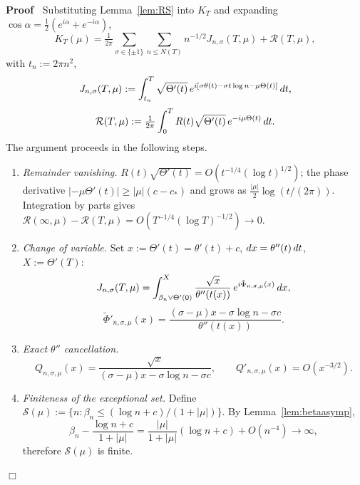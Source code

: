 \documentclass{article}
\newcommand{\assign}{:=}
\newcommand{\tmem}[1]{{\em #1\/}}
\newenvironment{proof}{\noindent\textbf{Proof\ }}{\hspace*{\fill}$\Box$\medskip}
\begin{document}
\begin{proof}
  Substituting Lemma~\ref{lem:RS} into $K_T$ and expanding $\cos \alpha =
  \tfrac{1}{2} (e^{i \alpha} + e^{- i \alpha})$,
  \[ K_T (\mu) = \tfrac{1}{2 \pi} \sum_{\sigma \in \{\pm 1\}} \sum_{n \le N
     (T)} n^{- 1 / 2} J_{n, \sigma} (T, \mu) +\mathcal{R} (T, \mu), \]
  with $t_n \assign 2 \pi n^2$,
  \[ J_{n, \sigma} (T, \mu) \assign \int_{t_n}^T \sqrt{\Theta' (t)} 
     \hspace{0.17em} e^{i [\sigma \theta (t) - \sigma t \log n - \mu \Theta
     (t)]}  \hspace{0.17em} dt, \]
  \[ \mathcal{R} (T, \mu) \assign \tfrac{1}{2 \pi} \int_0^T R (t)
     \sqrt{\Theta' (t)}  \hspace{0.17em} e^{- i \mu \Theta (t)} 
     \hspace{0.17em} dt. \]
  The argument proceeds in the following steps.
  \begin{enumerate}
    \item {\tmem{Remainder vanishing.}} $R (t) \sqrt{\Theta' (t)} = O (t^{- 1
    / 4} (\log t)^{1 / 2})$; the phase derivative $| - \mu \Theta' (t) | \ge |
    \mu |  (c - c_{\ast})$ and grows as $\tfrac{| \mu |}{2} \log (t / (2
    \pi))$. Integration by parts gives $\mathcal{R} (\infty, \mu) -\mathcal{R}
    (T, \mu) = O (T^{- 1 / 4} (\log T)^{- 1 / 2}) \to 0$.
    
    \item {\tmem{Change of variable.}} Set $x \assign \Theta' (t) = \theta'
    (t) + c$, $dx = \theta'' (t)  \hspace{0.17em} dt$, $X \assign \Theta'
    (T)$:
    \[ J_{n, \sigma} (T, \mu) = \int_{\beta_n \vee \Theta' (0)}^X
       \frac{\sqrt{x}}{\theta'' (t (x))}  \hspace{0.17em} e^{i
       \tilde{\Phi}_{n, \sigma, \mu} (x)}  \hspace{0.17em} dx, \]
    \[ \tilde{\Phi}'_{n, \sigma, \mu} (x) = \frac{(\sigma - \mu) x - \sigma
       \log n - \sigma c}{\theta'' (t (x))} . \]
    \item {\tmem{Exact $\theta''$ cancellation.}}
    \[ Q_{n, \sigma, \mu} (x) = \frac{\sqrt{x}}{(\sigma - \mu) x - \sigma \log
       n - \sigma c}, \qquad Q'_{n, \sigma, \mu} (x) = O (x^{- 3 / 2}) . \]
    \item {\tmem{Finiteness of the exceptional set.}} Define $\mathcal{S}
    (\mu) \assign \{n : \beta_n \le (\log n + c) / (1 + | \mu |)\}$. By
    Lemma~\ref{lem:betaasymp},
    \[ \beta_n - \frac{\log n + c}{1 + | \mu |} = \frac{| \mu |}{1 + | \mu |} 
       (\log n + c) + O (n^{- 4}) \to \infty, \]
    therefore $\mathcal{S} (\mu)$ is finite.
    

\end{enumerate}
\end{proof}
\end{document}
